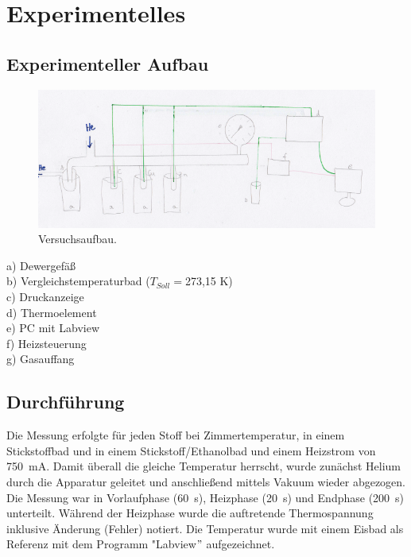 \documentclass[12pt,a4paper,titlepage,headinclude,bibtotoc]{scrartcl}
\begin{document}
\section{Experimentelles}
\subsection{Experimenteller Aufbau}

\begin{figure} [h!]
\begin{center}
\includegraphics[scale=0.9]{VersuchsaufbauZeichnung.png} \end{center}
\caption{Versuchsaufbau.}
\end{figure}

a) Dewergefäß\\
b) Vergleichstemperaturbad ($T_{Soll}=$273,15 K)\\
c) Druckanzeige\\
d) Thermoelement\\
e) PC mit Labview\\
f) Heizsteuerung\\
g) Gasauffang\\
\subsection{Durchführung}
Die Messung erfolgte für jeden Stoff bei Zimmertemperatur, in einem Stickstoffbad und in einem Stickstoff/Ethanolbad und einem Heizstrom von 750~mA. Damit überall die gleiche Temperatur herrscht, wurde zunächst Helium durch die Apparatur geleitet und anschließend mittels Vakuum wieder abgezogen. Die Messung war in Vorlaufphase (60~s), Heizphase (20~s) und Endphase (200~s) unterteilt. Während der Heizphase wurde die auftretende Thermospannung inklusive Änderung (Fehler) notiert. Die Temperatur wurde mit einem Eisbad als Referenz mit dem Programm "Labview$"$ aufgezeichnet.\\
\end{document}
